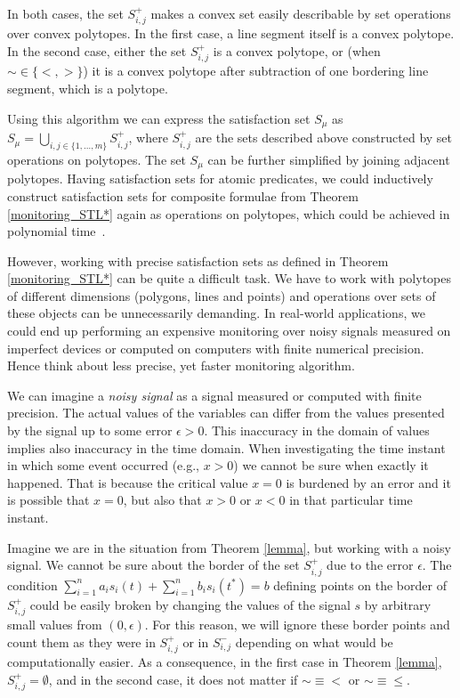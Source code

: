 In both cases, the set $S^+_{i,j}$ makes a convex set easily describable by set operations over convex polytopes. In the first case, a line segment itself is a convex polytope. In the second case, either the set $S^+_{i,j}$ is a convex polytope, or (when $\sim \in \lbrace <, > \rbrace$) it is a convex polytope after subtraction of one bordering line segment, which is a polytope.

Using this algorithm we can express the satisfaction set $S_{\mu}$ as $S_{\mu} = \bigcup_{i,j \in\{1,...,m\}} S^+_{i,j}$, where $S^+_{i,j}$ are the sets described above constructed by set operations on polytopes. The set $S_{\mu}$ can be further simplified by joining adjacent polytopes. Having satisfaction sets for atomic predicates, we could inductively construct satisfaction sets for composite formulae from Theorem \ref{monitoring_STL*} again as operations on polytopes, which could be achieved in polynomial time~\cite{GeometricAlgorithms}. 

However, working with precise satisfaction sets as defined in Theorem \ref{monitoring_STL*} can be quite a difficult task. We have to work with polytopes of different dimensions (polygons, lines and points) and operations over sets of these objects can be unnecessarily demanding. In real-world applications, we could end up performing an expensive monitoring over noisy signals measured on imperfect devices or computed on computers with finite numerical precision. Hence think about less precise, yet faster monitoring algorithm.



We can imagine a \emph{noisy signal} as a signal measured or computed with finite precision. The actual values of the variables can differ from the values presented by the signal up to some error $\epsilon > 0$. This inaccuracy in the domain of values implies also inaccuracy in the time domain. When investigating the time instant in which some event occurred (e.g., $x > 0$) we cannot be sure when exactly it happened. That is because the critical value $x = 0$ is burdened by an error and it is possible that $x = 0$, but also that $x > 0$ or $x < 0$ in that particular time instant.





Imagine we are in the situation from Theorem \ref{lemma}, but working with a noisy signal. We cannot be sure about the border of the set $S^+_{i, j}$ due to the error $\epsilon$. The condition $\sum_{i=1}^{n} a_i s_i(t) + \sum_{i=1}^{n} b_i s_i(t^\ast) = b$ defining points on the border of $S^+_{i, j}$ could be easily broken by changing the values of the signal $s$ by arbitrary small values from $(0, \epsilon)$. For this reason, we will ignore these border points and count them as they were in $S^+_{i, j}$ or in $S^-_{i, j}$ depending on what would be computationally easier. As a consequence, in the first case in Theorem \ref{lemma}, $S^+_{i, j} = \emptyset$, and in the second case, it does not matter if $\sim{}\equiv{}<$ or $\sim{}\equiv{}\leq$.

